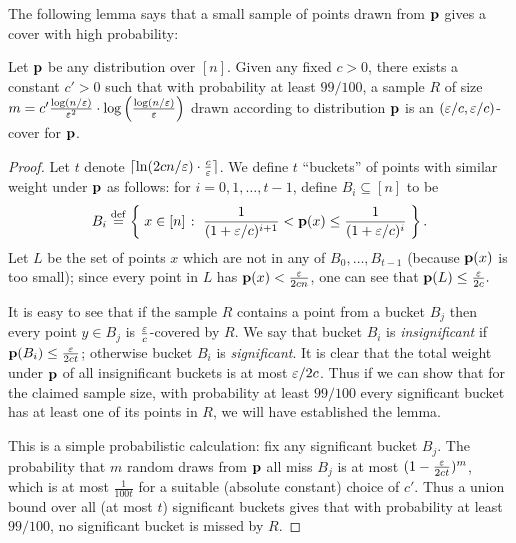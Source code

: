 The following lemma says that a small sample of points drawn from $\mathbf{p}$ gives a cover with high probability:
\begin{lemma}\label{lem:cover}
Let $\mathbf{p}$ be any distribution over $[n]$.
Given any fixed $c>0$, there exists a constant $c'>0$ such that
with probability at least $99/100$, a sample $R$ of size
$m=c' {\frac {\log(n/\varepsilon)}{\varepsilon^2}} \cdot \log \left(
{\frac {\log(n/\varepsilon)}{\varepsilon}}\right)$
drawn according to
distribution $\mathbf{p}$ is an $(\varepsilon/c,\varepsilon/c)$-cover for $\mathbf{p}$.
\end{lemma}

\begin{proof}
Let $t$ denote $\lceil\ln(2cn/\varepsilon) \cdot {\frac c {\ensuremath{\varepsilon}}}\rceil$.
We define $t$ ``buckets'' of points with similar weight under $\mathbf{p}$ as follows:
for \mbox{$i=0,1,\dots,t-1$,} define $B_i \subseteq [n]$
to be
\[
B_i \eqdef \setOfSuchThat{x \in [n] }{ {\frac{1}{(1+\eps/c)^{i+1}}} < \D(x) \leq {\frac{1}{(1+\eps/c)^i}} }.
\]
Let $L$ be the set of points $x$ which are not in any of $B_0,\dots,B_{t-1}$
(because $\mathbf{p}(x)$ is too small); since every point in $L$ has
$\mathbf{p}(x) < {\frac{\varepsilon}{2c n}}$, one can see that $\mathbf{p}(L) \leq {\frac {\ensuremath{\varepsilon}}{2c}}.$

It is easy to see that if the sample $R$ contains a point from a bucket
$B_j$ then every point $y \in B_j$ is ${\frac{\varepsilon}c}$-covered by $R$.
We say that bucket $B_i$ is \emph{insignificant} if $\mathbf{p}(B_i) \leq
{\frac{\ensuremath{\varepsilon}}{2ct}}$; otherwise bucket $B_i$ is \emph{significant}.
It is clear that the total weight under $\mathbf{p}$ of all insignificant buckets is
at most $\varepsilon/2c$.  Thus if we can show that for the claimed sample size,
with probability at least $99/100$ every significant
bucket has at least one of its points in $R$, we will have established the
lemma.

This is a simple probabilistic calculation:  fix any significant bucket
$B_j$.  The probability that $m$ random draws from $\mathbf{p}$ all miss $B_j$
is at most $(1- {\frac{\varepsilon}{2ct}})^m$, which is at most ${\frac{1}{100 t}}$
for a suitable (absolute constant) choice of $c'$.
Thus a union bound over all (at most $t$) significant buckets gives that
with probability at least $99/100$, no significant bucket is missed by
$R$.
\end{proof}

